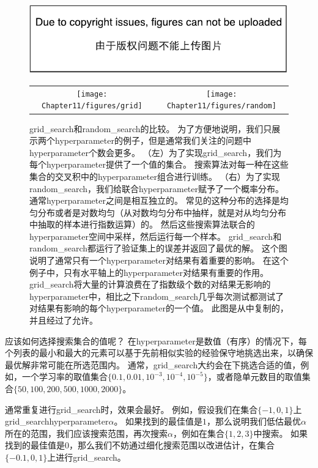 \begin{figure}[!htb]
\ifOpenSource
\centerline{\includegraphics{figure.pdf}}
\else
\begin{tabular}{cc}
\texttt{[image: Chapter11/figures/grid]} &
\texttt{[image: Chapter11/figures/random]}
\end{tabular}
\fi
\caption{\gls{grid_search}和\gls{random_search}的比较。
为了方便地说明，我们只展示两个\gls{hyperparameter}的例子，但是通常我们关注的问题中\gls{hyperparameter}个数会更多。
（左）为了实现\gls{grid_search}，我们为每个\gls{hyperparameter}提供了一个值的集合。
搜索算法对每一种在这些集合的交叉积中的\gls{hyperparameter}组合进行训练。
（右）为了实现\gls{random_search}，我们给联合\gls{hyperparameter}赋予了一个概率分布。
通常\gls{hyperparameter}之间是相互独立的。
常见的这种分布的选择是均匀分布或者是对数均匀（从对数均匀分布中抽样，就是对从均匀分布中抽取的样本进行指数运算）的。
然后这些搜索算法联合的\gls{hyperparameter}空间中采样，然后运行每一个样本。
\gls{grid_search}和\gls{random_search}都运行了验证集上的误差并返回了最优的解。
这个图说明了通常只有一个\gls{hyperparameter}对结果有着重要的影响。
在这个例子中，只有水平轴上的\gls{hyperparameter}对结果有重要的作用。
\gls{grid_search}将大量的计算浪费在了指数级个数的对结果无影响的\gls{hyperparameter}中，相比之下\gls{random_search}几乎每次测试都测试了对结果有影响的每个\gls{hyperparameter}的一个值。
此图是从\citet{Bergstra+Bengio-LW2011}中复制的，并且经过了允许。}
\label{fig:chap11_grid_vs_random}
\end{figure}

应该如何选择搜索集合的值呢？
在\gls{hyperparameter}是数值（有序）的情况下，每个列表的最小和最大的元素可以基于先前相似实验的经验保守地挑选出来，以确保最优解非常可能在所选范围内。
通常，\gls{grid_search}大约会在下挑选合适的值，例如，一个学习率的取值集合$\{0.1,0.01,10^{-3},10^{-4},10^{-5}\}$，或者隐单元数目的取值集合$\{50,100,200,500,1000,2000\}$。

通常重复进行\gls{grid_search}时，效果会最好。
例如，假设我们在集合$\{-1,0,1\}$上\gls{grid_search}\gls{hyperparameter}$\alpha$。
如果找到的最佳值是$1$，那么说明我们低估最优$\alpha$所在的范围，我们应该搜索范围，再次搜索$\alpha$，例如在集合$\{1,2,3\}$中搜索。
如果找到的最佳值是$0$，那么我们不妨通过细化搜索范围以改进估计，在集合$\{-0.1,0,1\}$上进行\gls{grid_search}。

